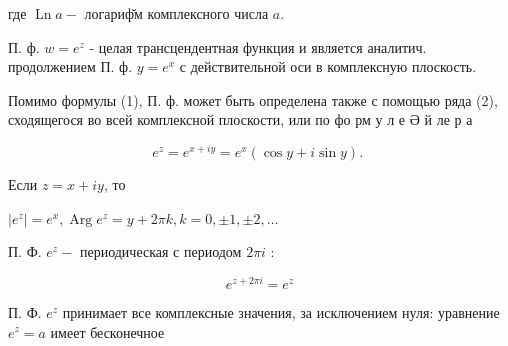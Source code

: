 \documentclass[10pt]{article}
\begin{document}
где $\operatorname{Ln} a-$ логариф̆м комплексного числа $a$.



П. ф. $w=e^{z}$ - целая трансцендентная функция и является аналитич. продолжением П. ф. $y=e^{x}$ с действительной оси в комплексную плоскость.



Помимо формулы (1), П. ф. может быть определена также с помощью ряда (2), сходящегося во всей комплексной плоскости, или по фо рм у л е Ә й ле р а



\[

e^{z}=e^{x+i y}=e^{x}(\cos y+i \sin y) \text {. }

\]



Если $z=x+i y$, то



$\left|e^{z}\right|=e^{x}, \operatorname{Arg} e^{z}=y+2 \pi k, k=0, \pm 1, \pm 2, \ldots$



П. Ф. $e^{z}-$ периодическая с периодом $2 \pi i$ :



\[

e^{z+2 \pi i}=e^{z}

\]



П. Ф. $e^{z}$ принимает все комплексные значения, за исключением нуля: уравнение $e^{z}=a$ имеет бесконечное
\end{document}
